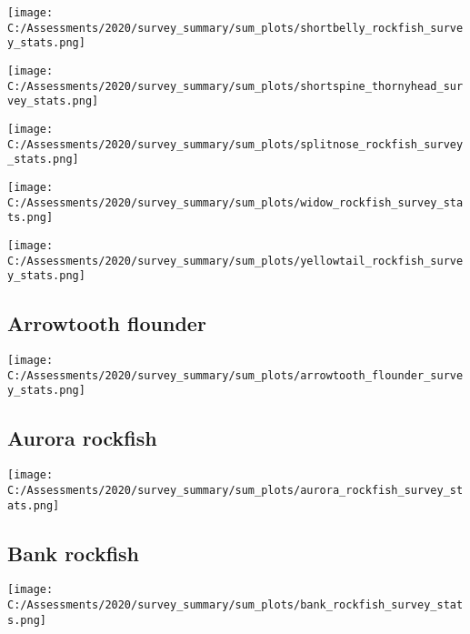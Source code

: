 \documentclass[12pt,]{article}
\begin{document}
\texttt{[image: C:/Assessments/2020/survey\_summary/sum\_plots/shortbelly\_rockfish\_survey\_stats.png]}
\FloatBarrier  

\texttt{[image: C:/Assessments/2020/survey\_summary/sum\_plots/shortspine\_thornyhead\_survey\_stats.png]}
\FloatBarrier  

\FloatBarrier

\texttt{[image: C:/Assessments/2020/survey\_summary/sum\_plots/splitnose\_rockfish\_survey\_stats.png]}
\FloatBarrier  

\FloatBarrier

\FloatBarrier

\FloatBarrier

\FloatBarrier

\texttt{[image: C:/Assessments/2020/survey\_summary/sum\_plots/widow\_rockfish\_survey\_stats.png]}
\FloatBarrier  

\FloatBarrier

\texttt{[image: C:/Assessments/2020/survey\_summary/sum\_plots/yellowtail\_rockfish\_survey\_stats.png]}
\FloatBarrier  

\hypertarget{arrowtooth-flounder}{%
\subsection{Arrowtooth flounder}\label{arrowtooth-flounder}}

\texttt{[image: C:/Assessments/2020/survey\_summary/sum\_plots/arrowtooth\_flounder\_survey\_stats.png]}
\FloatBarrier  

\hypertarget{aurora-rockfish}{%
\subsection{Aurora rockfish}\label{aurora-rockfish}}

\texttt{[image: C:/Assessments/2020/survey\_summary/sum\_plots/aurora\_rockfish\_survey\_stats.png]}
\FloatBarrier  

\hypertarget{bank-rockfish}{%
\subsection{Bank rockfish}\label{bank-rockfish}}

\texttt{[image: C:/Assessments/2020/survey\_summary/sum\_plots/bank\_rockfish\_survey\_stats.png]}
\FloatBarrier  
\end{document}
